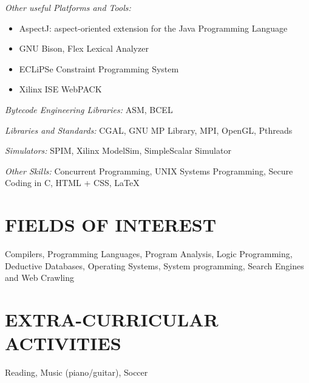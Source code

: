 \documentclass[margin]{res}
\begin{document}
\begin{resume}
        {\sl Other useful Platforms and Tools:}
        \begin{itemize}
        \item AspectJ: aspect-oriented extension for the Java Programming Language
        \item GNU Bison, Flex Lexical Analyzer
        \item ECLiPSe Constraint Programming System
        \item Xilinx ISE WebPACK
        \end{itemize}

        {\sl Bytecode Engineering Libraries:}
        ASM, BCEL

        {\sl Libraries and Standards:}
        CGAL, GNU MP Library, MPI, OpenGL, Pthreads

        {\sl Simulators:}
        SPIM, Xilinx ModelSim, SimpleScalar Simulator

        {\sl Other Skills:}
        Concurrent Programming, UNIX Systems Programming, Secure Coding in C, HTML + CSS, \LaTeX

\section{FIELDS OF INTEREST} Compilers, Programming Languages, Program Analysis, Logic Programming, \\ 
Deductive Databases, Operating Systems, System programming, Search Engines and Web Crawling

\section{EXTRA-CURRICULAR \\ ACTIVITIES}             
Reading, Music (piano/guitar), Soccer

\end{resume}
\end{document}
